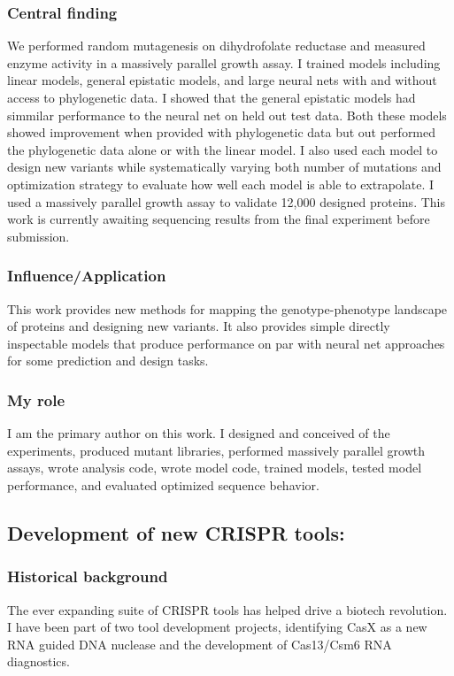 \documentclass{article}
\begin{document}
\subsubsection{Central finding}
We performed random mutagenesis on dihydrofolate reductase and measured enzyme activity in a massively parallel growth assay. 
I trained models including linear models, general epistatic models, and large neural nets with and without access to phylogenetic data. 
I showed that the general epistatic models had simmilar performance to the neural net on held out test data.
Both these models showed improvement when provided with phylogenetic data but out performed the phylogenetic data alone or with the linear model. 
I also used each model to design new variants while systematically varying both number of mutations and optimization strategy to evaluate how well each model is able to extrapolate.
I used a massively parallel growth assay to validate 12,000 designed proteins.
This work is currently awaiting sequencing results from the final experiment before submission.
%
\subsubsection{Influence/Application}
This work provides new methods for mapping the genotype-phenotype landscape of proteins and designing new variants.
It also provides simple directly inspectable models that produce performance on par with neural net approaches for some prediction and design tasks.
%
\subsubsection{My role}
I am the primary author on this work.
I designed and conceived of the experiments, produced mutant libraries, performed massively parallel growth assays, wrote analysis code, wrote model code, trained models, tested model performance, and evaluated optimized sequence behavior.
%



\newrefsection
\subsection{Development of new CRISPR tools:}
\subsubsection{Historical background}
The ever expanding suite of CRISPR tools has helped drive a biotech revolution.
I have been part of two tool development projects, identifying CasX as a new RNA guided DNA nuclease and the development of Cas13/Csm6 RNA diagnostics.
%
\end{document}

